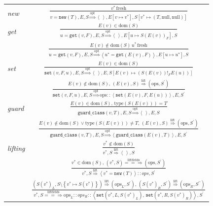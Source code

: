 \documentclass[preprint]{sigplanconf}
\begin{document}
\begin{figure}
\begin{center}
\begin{tabular}{lc}
\emph{new} & ${\displaystyle \frac{v^{*}\,\mathrm{fresh}}{v=\mathtt{new}(T),E,S\overset{\mathrm{opt}}{\Longrightarrow}\left\langle \,\right\rangle ,E\left[v\mapsto v^{*}\right],S\left[v^{*}\mapsto\left(T,\mathrm{null,null}\right)\right]}}$\tabularnewline[3em]
\emph{get} & ${\displaystyle \frac{E(v)\in\mathrm{dom}(S)}{u=\mathtt{get}(v,F),E,S\overset{\mathrm{opt}}{\Longrightarrow}\left\langle \,\right\rangle ,E\left[u\mapsto S(E(v))_{F}\right],S}}$\tabularnewline[3em]
 & ${\displaystyle \frac{E(v)\notin\mathrm{dom}(S)\, u^{*}\,\mathrm{fresh}}{u=\mathtt{get}(v,F),E,S\overset{\mathrm{opt}}{\Longrightarrow}\left\langle u^{*}=\mathtt{get}(E(v),F)\right\rangle ,E\left[u\mapsto u^{*}\right],S}}$\tabularnewline[3em]
\emph{set} & ${\displaystyle \frac{E(v)\in\mathrm{dom}(S)}{\mathtt{set}\left(v,F,u\right),E,S\overset{\mathrm{opt}}{\Longrightarrow}\left\langle \,\right\rangle ,E,S\left[E\left(v\right)\mapsto\left(S(E(v))!_{F}E(u)\right)\right]}}$\tabularnewline[3em]
 & ${\displaystyle \frac{E(v)\notin\mathrm{dom}\left(S\right),\,\left(E(v),S\right)\overset{\mathrm{lift}}{\Longrightarrow}\left(\mathrm{ops},S^{\prime}\right)}{\mathtt{set}\left(v,F,u\right),E,S\overset{\mathrm{opt}}{\Longrightarrow}\mathrm{ops}::\left\langle \mathtt{set}\left(E(v),F,E(u)\right)\right\rangle ,E,S^{\prime}}}$\tabularnewline[3em]
\emph{guard} & ${\displaystyle \frac{E(v)\in\mathrm{dom}(S),\,\mathrm{type}(S(E(v)))=T}{\mathtt{guard\_class}(v,T),E,S\overset{\mathrm{opt}}{\Longrightarrow}\left\langle \,\right\rangle ,E,S}}$\tabularnewline[3em]
 & ${\displaystyle \frac{E(v)\notin\mathrm{dom}(S)\vee\mathrm{type}(S(E(v)))\neq T,\,\left(E(v),S\right)\overset{\mathrm{lift}}{\Longrightarrow}\left(\mathrm{ops},S^{\prime}\right)}{\mathtt{guard\_class}(v,T),E,S\overset{\mathrm{opt}}{\Longrightarrow}\left\langle \mathtt{guard\_class}(E\left(v\right),T)\right\rangle ,E,S^{\prime}}}$\tabularnewline[3em]
\emph{lifting} & ${\displaystyle \frac{v^{*}\notin\mathrm{dom}(S)}{v^{*},S\overset{\mathrm{lift}}{\Longrightarrow}\left\langle \,\right\rangle ,S}}$\tabularnewline[3em]
 & ${\displaystyle \frac{v^{*}\in\mathrm{dom}(S),\,\left(v^{*},S\right)\overset{\mathrm{liftfields}}{=\!=\!\Longrightarrow}\left(\mathrm{ops},S^{\prime}\right)}{v^{*},S\overset{\mathrm{lift}}{\Longrightarrow}\left\langle v^{*}=\mathtt{new}\left(T\right)\right\rangle ::ops,S^{\prime}}}$\tabularnewline[3em]
 & ${\displaystyle \frac{\left(S\left(v^{*}\right)_{L},S\setminus\left\{ v^{*}\mapsto S\left(v^{*}\right)\right\} \right)\overset{\mathrm{lift}}{\Longrightarrow}\left(\mathrm{ops}_{L},S^{\prime}\right),\,\left(S\left(v^{*}\right)_{R},S^{\prime}\right)\overset{\mathrm{lift}}{\Longrightarrow}\left(\mathrm{ops}_{R},S^{\prime\prime}\right)}{v^{*},S\overset{\mathrm{liftfields}}{=\!=\!\Longrightarrow}\mathrm{ops}_{L}::ops_{R}::\left\langle \mathtt{set}\left(v^{*},L,S\left(v^{*}\right)_{L}\right),\,\mathtt{set}\left(v^{*},R,S\left(v^{*}\right)_{R}\right)\right\rangle ,S^{\prime}}}$\tabularnewline[3em]
\end{tabular}


\end{center}
\end{figure}
\end{document}

